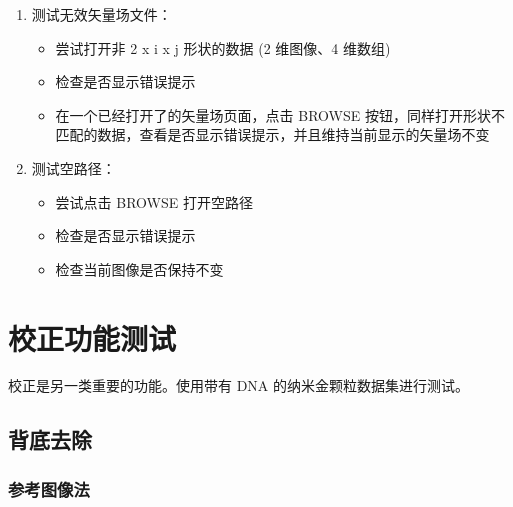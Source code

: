 \documentclass[a4paper,12pt]{report}	%
\begin{document}
\begin{enumerate}
    \item 测试无效矢量场文件：
    \begin{itemize}
        \item 尝试打开非 2 x i x j 形状的数据 (2 维图像、4 维数组)
        \item 检查是否显示错误提示
        \item 在一个已经打开了的矢量场页面，点击 BROWSE 按钮，同样打开形状不匹配的数据，查看是否显示错误提示，并且维持当前显示的矢量场不变
    \end{itemize}

    \item 测试空路径：
    \begin{itemize}
        \item 尝试点击 BROWSE 打开空路径
        \item 检查是否显示错误提示
        \item 检查当前图像是否保持不变
    \end{itemize}
\end{enumerate}



\chapter{校正功能测试}

校正是另一类重要的功能。使用带有 DNA 的纳米金颗粒数据集进行测试。

\section{背底去除}

\subsection{参考图像法}
\end{document}
